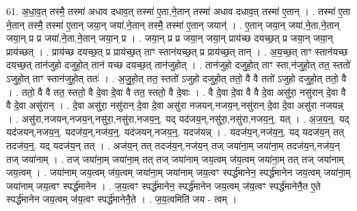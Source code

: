 \documentclass[17pt]{extarticle}
\begin{document}
61. अ॒धा॒व॒त् तस्मै॒ तस्मा॑ अधाव दधाव॒त् तस्मा॑ ए॒ता,ने॒तान् तस्मा॑ अधाव दधाव॒त् तस्मा॑ ए॒तान् । . तस्मा॑ ए॒ता ने॒तान् तस्मै॒ तस्मा॑ ए॒तान् जया॒न् जया॑,ने॒तान् तस्मै॒ तस्मा॑ ए॒तान् जयान्॑ । . ए॒तान् जया॒न् जया॑,ने॒ता,ने॒तान् जया॒न् प्र प्र जया॑,ने॒ता,ने॒तान् जया॒न् प्र । . जया॒न् प्र प्र जया॒न् जया॒न् प्राय॑च्छ दयच्छ॒त् प्र जया॒न् जया॒न् प्राय॑च्छत् । . प्राय॑च्छ दयच्छ॒त् प्र प्राय॑च्छ॒त् ताꣳ स्तान॑यच्छ॒त् प्र प्राय॑च्छ॒त् तान् । . अ॒य॒च्छ॒त् ताꣳ स्तान॑यच्छ दयच्छ॒त् तान॑जुहो दजुहो॒त् तान॑ यच्छ दयच्छ॒त् तान॑जुहोत् । . तान॑जुहो दजुहो॒त् ताꣳ स्ता,न॑जुहो॒त् तत॒ स्ततो॑ ऽजुहो॒त् ताꣳ स्तान॑जुहो॒त् ततः॑ । . अ॒जु॒हो॒त् तत॒ स्ततो॑ ऽजुहो दजुहो॒त् ततो॒ वै वै ततो॑ ऽजुहो दजुहो॒त् ततो॒ वै । . ततो॒ वै वै तत॒ स्ततो॒ वै दे॒वा दे॒वा वै तत॒ स्ततो॒ वै दे॒वाः । . वै दे॒वा दे॒वा वै वै दे॒वा असु॑रा॒ नसु॑रान् दे॒वा वै वै दे॒वा असु॑रान् । . दे॒वा असु॑रा॒ नसु॑रान् दे॒वा दे॒वा असु॑रा नजयन्,नजय॒न्,नसु॑रान् दे॒वा दे॒वा असु॑रा नजयन्न् । . असु॑रा,नजयन्,नजय॒न्,नसु॑रा॒,नसु॑रा,नजय॒न्॒. यद् यद॑जय॒न्,नसु॑रा॒,नसु॑रा,नजय॒न्॒. यत् । . अ॒ज॒य॒न्॒. यद् यद॑जयन्,नजय॒न्॒. यदज॑य॒न्,नज॑य॒न्॒. यद॑जयन्,नजय॒न्॒. यदज॑यन्न् । . यदज॑य॒न्,नज॑य॒न्॒. यद् यदज॑य॒न् तत् तदज॑य॒न्॒. यद् यदज॑य॒न् तत् । . अज॑य॒न् तत् तदज॑य॒न्,नज॑य॒न् तज् जया॑ना॒म् जया॑ना॒म् तदज॑य॒न्,नज॑य॒न् तज् जया॑नाम् । . तज् जया॑ना॒म् जया॑ना॒म् तत् तज् जया॑नाम् जय॒त्वम् ज॑य॒त्वम् जया॑ना॒म् तत् तज् जया॑नाम् जय॒त्वम् । . जया॑नाम् जय॒त्वम् ज॑य॒त्वम् जया॑ना॒म् जया॑नाम् जय॒त्वꣳ स्पर्द्ध॑मानेन॒ स्पर्द्ध॑मानेन जय॒त्वम् जया॑ना॒म् जया॑नाम् जय॒त्वꣳ स्पर्द्ध॑मानेन । . ज॒य॒त्वꣳ स्पर्द्ध॑मानेन॒ स्पर्द्ध॑मानेन जय॒त्वम् ज॑य॒त्वꣳ स्पर्द्ध॑मानेनै॒त ए॒ते स्पर्द्ध॑मानेन जय॒त्वम् ज॑य॒त्वꣳ स्पर्द्ध॑मानेनै॒ते । . ज॒य॒त्वमिति॑ जय - त्वम् । \newline
\end{document}
